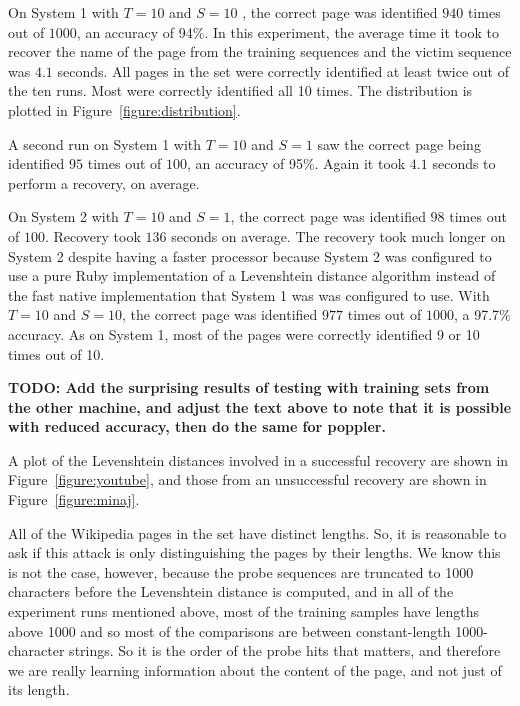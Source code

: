 \documentclass[letterpaper,twocolumn,10pt]{article}
\begin{document}
On System 1 with $T=10$ and $S=10$ , the correct page was
identified $940$ times out of $1000$, an accuracy of 94\%. In this experiment,
the average time it took to recover the name of the page from the training
sequences and the victim sequence was $4.1$ seconds. All pages in the set were
correctly identified at least twice out of the ten runs. Most were correctly
identified all 10 times. The distribution is plotted in
Figure~\ref{figure:distribution}.

A second run on System 1 with $T=10$ and $S=1$ saw the
correct page being identified $95$ times out of $100$, an accuracy of 95\%.
Again it took $4.1$ seconds to perform a recovery, on average.

On System 2 with $T=10$ and $S=1$, the correct page was
identified $98$ times out of $100$. Recovery took $136$ seconds on average. The
recovery took much longer on System 2 despite having a faster processor because
System 2 was configured to use a pure Ruby implementation of a Levenshtein
distance algorithm instead of the fast native implementation that System 1 was
was configured to use. With $T=10$ and $S=10$, the correct
page was identified $977$ times out of $1000$, a 97.7\% accuracy. As on System
1, most of the pages were correctly identified 9 or 10 times out of 10.

\textbf{TODO: Add the surprising results of testing with training sets from the
    other machine, and adjust the text above to note that it is possible with
reduced accuracy, then do the same for poppler.}

A plot of the Levenshtein distances involved in a successful recovery are shown
in Figure~\ref{figure:youtube}, and those from an unsuccessful recovery are
shown in Figure~\ref{figure:minaj}.

All of the Wikipedia pages in the set have distinct lengths. So, it is
reasonable to ask if this attack is only distinguishing the pages by their
lengths. We know this is not the case, however, because the probe sequences are
truncated to 1000 characters before the Levenshtein distance is computed, and in
all of the experiment runs mentioned above, most of the training samples have
lengths above 1000 and so most of the comparisons are between constant-length
1000-character strings. So it is the order of the probe hits that matters, and
therefore we are really learning information about the content of the page, and
not just of its length.
\end{document}
